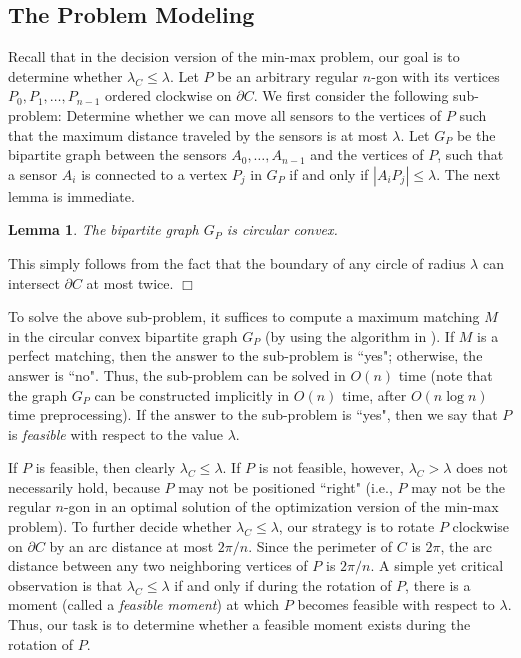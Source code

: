 \documentclass[11pt]{article}
\newenvironment{proof}{\noindent {\textbf{Proof:}}\rm}{\hfill $\Box$
\rm}
\newtheorem{Lem}{Lemma}
\begin{document}
\subsection{The Problem Modeling}
\label{subsec-model}

Recall that in the decision version of the min-max problem,
our goal is to determine whether $\lambda_C\leq
\lambda$. Let $P$ be an arbitrary regular $n$-gon with its vertices
$P_0,P_1,\ldots,P_{n-1}$ ordered clockwise on $\partial C$. We first
consider the following sub-problem: Determine whether we can move all sensors to
the vertices of $P$ such that the maximum distance traveled by the
sensors is at most $\lambda$. Let $G_P$ be the bipartite graph
between the sensors $A_0,\ldots,A_{n-1}$ and the vertices of $P$,
such that a sensor $A_i$ is connected to a vertex $P_j$ in $G_P$ if and only
if $|A_iP_j|\leq \lambda$.  The next lemma is immediate.
\begin{Lem}\label{lem:cir-conv}
The bipartite graph $G_P$ is circular convex.
\end{Lem}
\begin{proof}
This simply follows from the fact that the boundary of any circle of radius $\lambda$
can intersect $\partial C$ at most twice.
\end{proof}

To solve the above sub-problem, it suffices to compute a maximum matching $M$
in the circular convex bipartite graph $G_P$ (by using the algorithm
in \cite{ref:LiangCi95}). If $M$ is a
perfect matching, then the answer to the sub-problem is ``yes";
otherwise, the answer is ``no". Thus, the sub-problem can be solved in
$O(n)$ time (note that the graph $G_P$ can be constructed implicitly
in $O(n)$ time, after $O(n\log n)$ time preprocessing).
If the answer to the sub-problem is ``yes", then we say
that $P$ is {\em feasible} with respect to the value $\lambda$.

If $P$ is feasible, then clearly $\lambda_C\leq \lambda$.
If $P$ is not feasible, however, $\lambda_C> \lambda$ does not necessarily hold,
because $P$ may not be positioned ``right" (i.e., $P$ may not be the regular
$n$-gon in an optimal solution of
the optimization version of the min-max problem). To further
decide whether $\lambda_C\leq \lambda$, our strategy is to rotate
$P$ clockwise on $\partial C$ by an arc distance at most $2\pi/n$.
Since the perimeter of $C$ is $2\pi$, the arc distance
between any two neighboring vertices of $P$ is $2\pi/n$. A simple
yet critical observation is that $\lambda_C\leq \lambda$ if and only
if during the rotation of $P$, there is a moment (called a {\em
feasible moment}) at which $P$
becomes feasible with respect to $\lambda$. Thus, our task is to determine whether a feasible moment exists
during the rotation of $P$.
\end{document}
